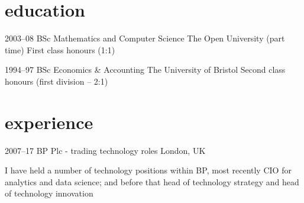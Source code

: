 \documentclass[]{friggeri-cv}
\begin{document}

\section{education}

\begin{entrylist}


\entry
{2003--08}
{BSc {\normalfont Mathematics and Computer Science}}
{The Open University (part time)}
{First class honours (1:1)}


\entry
{1994--97}
{BSc {\normalfont Economics \& Accounting}}
{The University of Bristol}
{Second class honours (first division -- 2:1)}


\end{entrylist}


\section{experience}


\begin{entrylist}


\entry
{2007--17}
{BP Plc - trading technology roles}
{London, UK}
{}
\end{entrylist}

\vspace{-0.8cm}
I have held a number of technology positions within BP, most recently CIO for analytics and data science; and before that head of technology strategy and head of technology innovation
\end{document}
